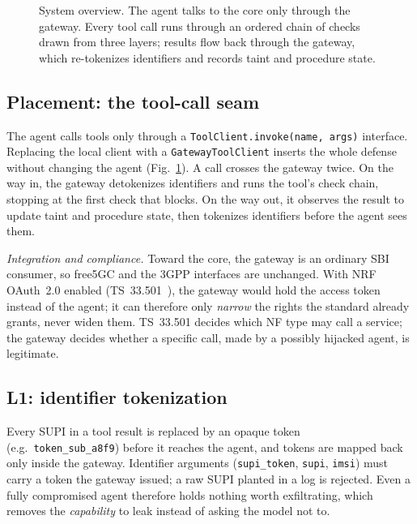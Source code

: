 \documentclass[conference]{IEEEtran}
\newcommand{\code}[1]{\texttt{\small #1}}
\begin{document}
\begin{figure}[t]
\caption{System overview. The agent talks to the core only through the gateway. Every tool
call runs through an ordered chain of checks drawn from three layers; results flow back
through the gateway, which re-tokenizes identifiers and records taint and procedure state.}
\label{fig:arch}
\end{figure}

\subsection{Placement: the tool-call seam}
The agent calls tools only through a \code{ToolClient.invoke(name, args)} interface.
Replacing the local client with a \code{GatewayToolClient} inserts the whole defense
without changing the agent (Fig.~\ref{fig:arch}). A call crosses the gateway twice. On the
way in, the gateway detokenizes identifiers and runs the tool's check chain, stopping at the
first check that blocks. On the way out, it observes the result to update taint and
procedure state, then tokenizes identifiers before the agent sees them.

\textit{Integration and compliance.} Toward the core, the gateway is an ordinary SBI
consumer, so free5GC and the 3GPP interfaces are unchanged. With NRF OAuth~2.0 enabled
(TS~33.501~\cite{ts33501}), the gateway would hold the access token instead of the agent; it
can therefore only \emph{narrow} the rights the standard already grants, never widen them.
TS~33.501 decides which NF type may call a service; the gateway decides whether a specific
call, made by a possibly hijacked agent, is legitimate.

\subsection{L1: identifier tokenization}
Every SUPI in a tool result is replaced by an opaque token (e.g.\ \code{token\_sub\_a8f9})
before it reaches the agent, and tokens are mapped back only inside the gateway. Identifier
arguments (\code{supi\_token}, \code{supi}, \code{imsi}) must carry a token the gateway
issued; a raw SUPI planted in a log is rejected. Even a fully compromised agent therefore
holds nothing worth exfiltrating, which removes the \emph{capability} to leak instead of
asking the model not to.
\end{document}
